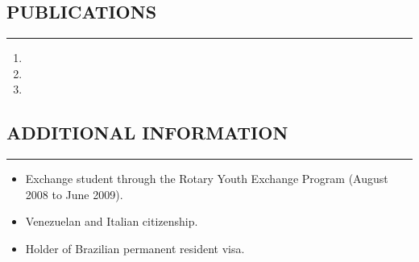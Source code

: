 \documentclass[11pt,letterpaper]{article}
\begin{document}
\subsection*{PUBLICATIONS}
	\vspace{-0.5em}
	\hrule
	\vspace{0.6em}

\begin{enumerate}
	\item {}
	\item {}
	\item {}
\end{enumerate}
	
\subsection*{ADDITIONAL INFORMATION}
	\vspace{-0.5em}
	\hrule
	\vspace{0.8em}
	\begin{itemize}
		\item Exchange student through the Rotary Youth Exchange Program (August 2008 to June 2009).
		\item Venezuelan and Italian citizenship.
		\item Holder of Brazilian permanent resident visa.
	\end{itemize}
	
	
\end{document}
